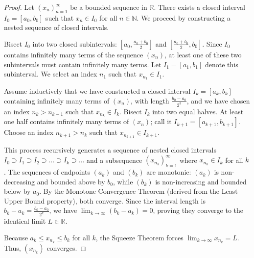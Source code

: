 \begin{proof}
Let $(x_n)_{n=1}^\infty$ be a bounded sequence in $\mathbb{R}$. There exists a closed interval $I_0 = [a_0, b_0]$ such that $x_n \in I_0$ for all $n \in \mathbb{N}$. We proceed by constructing a nested sequence of closed intervals. 

Bisect $I_0$ into two closed subintervals: $[a_0, \frac{a_0+b_0}{2}]$ and $[\frac{a_0+b_0}{2}, b_0]$. Since $I_0$ contains infinitely many terms of the sequence $(x_n)$, at least one of these two subintervals must contain infinitely many terms. Let $I_1 = [a_1, b_1]$ denote this subinterval. We select an index $n_1$ such that $x_{n_1} \in I_1$.

Assume inductively that we have constructed a closed interval $I_k = [a_k, b_k]$ containing infinitely many terms of $(x_n)$, with length $\frac{b_0-a_0}{2^k}$, and we have chosen an index $n_k > n_{k-1}$ such that $x_{n_k} \in I_k$. Bisect $I_k$ into two equal halves. At least one half contains infinitely many terms of $(x_n)$; call it $I_{k+1} = [a_{k+1}, b_{k+1}]$. Choose an index $n_{k+1} > n_k$ such that $x_{n_{k+1}} \in I_{k+1}$.

This process recursively generates a sequence of nested closed intervals $I_0 \supset I_1 \supset I_2 \supset \dots \supset I_k \supset \dots$ and a subsequence $(x_{n_k})_{k=1}^\infty$ where $x_{n_k} \in I_k$ for all $k$. The sequences of endpoints $(a_k)$ and $(b_k)$ are monotonic: $(a_k)$ is non-decreasing and bounded above by $b_0$, while $(b_k)$ is non-increasing and bounded below by $a_0$. By the Monotone Convergence Theorem (derived from the Least Upper Bound property), both converge. Since the interval length is $b_k - a_k = \frac{b_0-a_0}{2^k}$, we have $\lim_{k \to \infty} (b_k - a_k) = 0$, proving they converge to the identical limit $L \in \mathbb{R}$.

Because $a_k \le x_{n_k} \le b_k$ for all $k$, the Squeeze Theorem forces $\lim_{k \to \infty} x_{n_k} = L$. Thus, $(x_{n_k})$ converges.
\end{proof}